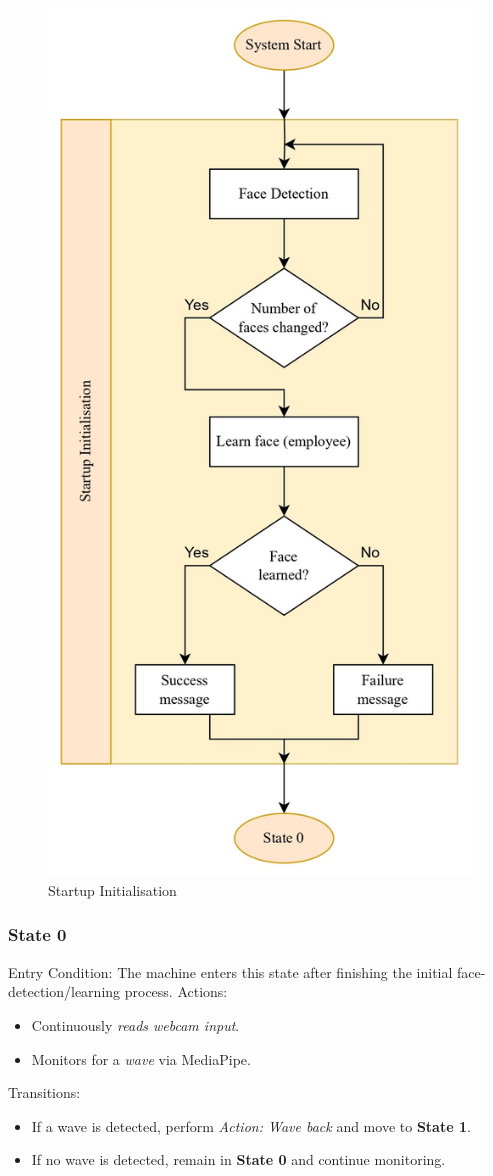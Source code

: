 \documentclass[conference]{IEEEtran}
\begin{document}
\begin{figure}
    \centering
    \includegraphics[width=.6\linewidth]{Startup Initialisation.jpg}
    \caption{Startup Initialisation}
    \label{Startup Initialisation}
\end{figure}

\subsubsection{State 0}
Entry Condition:
The machine enters this state after finishing the initial face-detection/learning process.
Actions:
\begin{itemize}
  \item Continuously \emph{reads webcam input}.
  \item Monitors for a \emph{wave} via MediaPipe.
\end{itemize}
Transitions:
\begin{itemize}
  \item If a wave is detected, perform \emph{Action: Wave back} and move to \textbf{State 1}.
  \item If no wave is detected, remain in \textbf{State 0} and continue monitoring.
\end{itemize}
\end{document}
